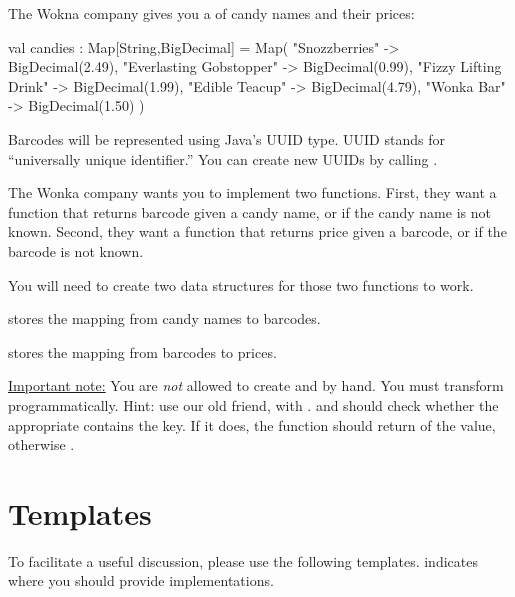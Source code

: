\documentclass[9pt]{extbook}
\begin{document}
The Wokna company gives you a  of candy names and their prices:

\begin{scalacode}
val candies : Map[String,BigDecimal] = Map(
  "Snozzberries" -> BigDecimal(2.49),
  "Everlasting Gobstopper" -> BigDecimal(0.99),
  "Fizzy Lifting Drink" -> BigDecimal(1.99),
  "Edible Teacup" -> BigDecimal(4.79),
  "Wonka Bar" -> BigDecimal(1.50)
)
\end{scalacode}

Barcodes will be represented using Java's UUID type.  UUID stands for ``universally unique identifier.''  You can create new UUIDs by calling .

The Wonka company wants you to implement two functions.  First, they want a function  that returns  barcode given a candy name, or  if the candy name is not known.  Second, they want a function  that returns  price given a barcode, or  if the barcode is not known.

You will need to create two  data structures for those two functions to work.

 stores the mapping from candy names to barcodes.

 stores the mapping from barcodes to prices.

\underline{Important note:} You are \emph{not} allowed to create  and  by hand.  You must transform  programmatically.  Hint: use our old friend,  with .   and  should check whether the appropriate  contains the key.  If it does, the function should return  of the value, otherwise .

\section{Templates}

To facilitate a useful discussion, please use the following templates.   indicates where you should provide implementations.
\end{document}
